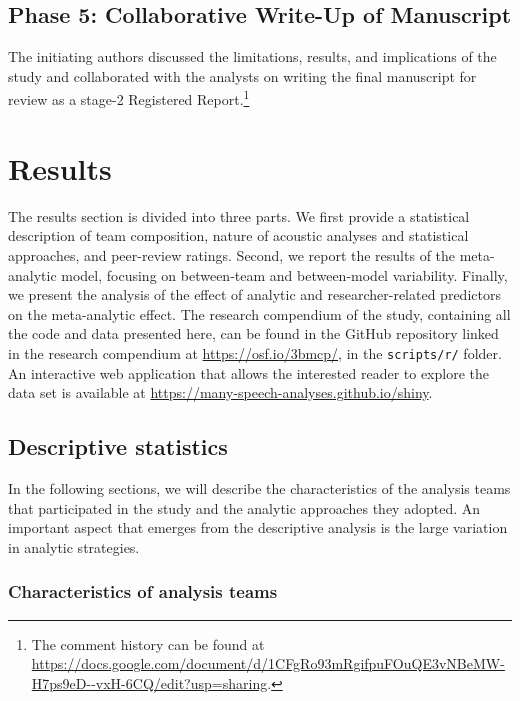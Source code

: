 \documentclass[Review,times,sageh]{sagej}
\begin{document}
\hypertarget{phase-5-collaborative-write-up-of-manuscript}{%
\subsection{Phase 5: Collaborative Write-Up of Manuscript}\label{phase-5-collaborative-write-up-of-manuscript}}

The initiating authors discussed the limitations, results, and implications of the study and collaborated with the analysts on writing the final manuscript for review as a stage-2 Registered Report.\footnote{The comment history can be found at \url{https://docs.google.com/document/d/1CFgRo93mRgifpuFOuQE3vNBeMW-H7ps9eD--vxH-6CQ/edit?usp=sharing}.}

\hypertarget{results}{%
\section{Results}\label{results}}

The results section is divided into three parts.
We first provide a statistical description of team composition, nature of acoustic analyses and statistical approaches, and peer-review ratings.
Second, we report the results of the meta-analytic model, focusing on between-team and between-model variability.
Finally, we present the analysis of the effect of analytic and researcher-related predictors on the meta-analytic effect.
The research compendium of the study, containing all the code and data presented here, can be found in the GitHub repository linked in the research compendium at \url{https://osf.io/3bmcp/}, in the \texttt{scripts/r/} folder.
An interactive web application that allows the interested reader to explore the data set is available at \url{https://many-speech-analyses.github.io/shiny}.

\hypertarget{descr-stats}{%
\subsection{Descriptive statistics}\label{descr-stats}}

In the following sections, we will describe the characteristics of the analysis teams that participated in the study and the analytic approaches they adopted.
An important aspect that emerges from the descriptive analysis is the large variation in analytic strategies.

\hypertarget{characteristics-of-analysis-teams}{%
\subsubsection{Characteristics of analysis teams}\label{characteristics-of-analysis-teams}}
\end{document}
